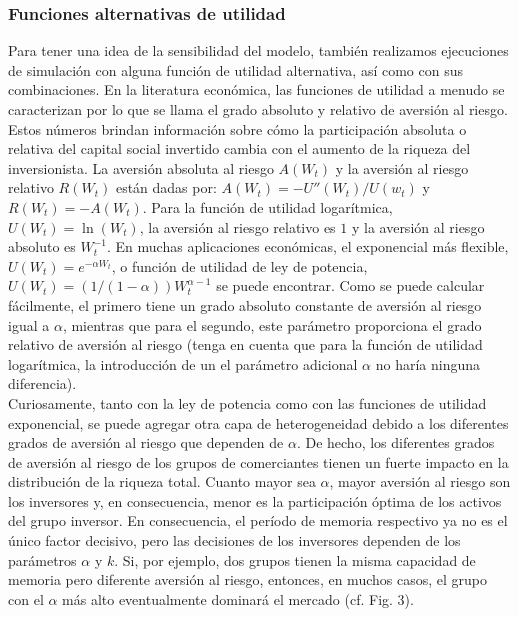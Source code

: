 \documentclass[12pt,a4paper]{article}
\begin{document}
\subsubsection*{Funciones alternativas de utilidad}
\quad Para tener una idea de la sensibilidad del modelo, también realizamos ejecuciones de simulación con alguna función de utilidad alternativa, así como con sus combinaciones. En la literatura económica, las funciones de utilidad a menudo se caracterizan por lo que se llama el grado absoluto y relativo de aversión al riesgo. Estos números brindan información sobre cómo la participación absoluta o relativa del capital social invertido cambia con el aumento de la riqueza del inversionista. La aversión absoluta al riesgo $ A (W_t) $ y la aversión al riesgo relativo $ R (W_t) $ están dadas por: $A(W_t)=-U''(W_t)/U(w_t)$ y $R(W_t) = -A(W_t)$. Para la función de utilidad logarítmica, $ U(W_t) = \ln(W_t) $, la aversión al riesgo relativo es $ 1 $ y la aversión al riesgo absoluto es $ W_t^{- 1} $. En muchas aplicaciones económicas, el exponencial más flexible, $U(W_t)=e^{-\alpha W_t}$, o función de utilidad de ley de potencia, $U(W_t)=(1/(1-\alpha))W^{\alpha -1}_t $ se puede encontrar. Como se puede calcular fácilmente, el primero tiene un grado absoluto constante de aversión al riesgo igual a $ \alpha$, mientras que para el segundo, este parámetro proporciona el grado relativo de aversión al riesgo (tenga en cuenta que para la función de utilidad logarítmica, la introducción de un el parámetro adicional $\alpha $ no haría ninguna diferencia).\\
\quad Curiosamente, tanto con la ley de potencia como con las funciones de utilidad exponencial, se puede agregar otra capa de heterogeneidad debido a los diferentes grados de aversión al riesgo que dependen de $\alpha$. De hecho, los diferentes grados de aversión al riesgo de los grupos de comerciantes tienen un fuerte impacto en la distribución de la riqueza total. Cuanto mayor sea $\alpha$, mayor aversión al riesgo son los inversores y, en consecuencia, menor es la participación óptima de los activos del grupo inversor. En consecuencia, el período de memoria respectivo ya no es el único factor decisivo, pero las decisiones de los inversores dependen de los parámetros $\alpha$ y $ k $. Si, por ejemplo, dos grupos tienen la misma capacidad de memoria pero diferente aversión al riesgo, entonces, en muchos casos, el grupo con el $\alpha$ más alto eventualmente dominará el mercado (cf. Fig. 3).\\
\end{document}
